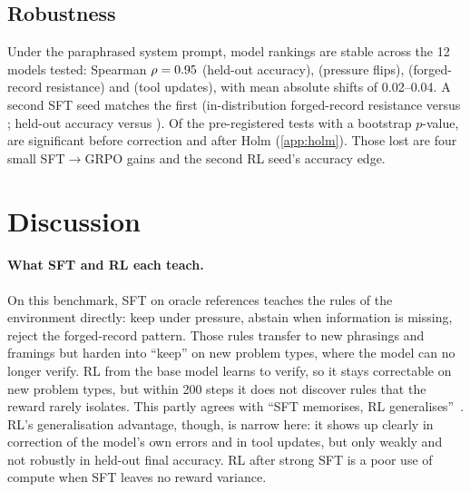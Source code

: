 \documentclass[11pt]{article}
\begin{document}
\subsection{Robustness}
Under the paraphrased system prompt, model rankings are stable across the 12 models tested: Spearman
$\rho = 0.95$ (held-out accuracy), \nrhoFlipPara{} (pressure flips), \nrhoForgedPara{} (forged-record
resistance) and \nrhoUpdPara{} (tool updates), with mean absolute shifts of 0.02--0.04. A second SFT seed matches the
first (in-distribution forged-record resistance \nSFTsIdForged{} versus \nSFTIdForged{}; held-out accuracy
\nSFTsStAcc{} versus \nSFTStAcc{}). Of the \nholmN{} pre-registered tests with a bootstrap $p$-value, \nholmRaw{} are
significant before correction and \nholmSig{} after Holm (\cref{app:holm}). Those lost are four small SFT$\to$GRPO
gains and the second RL seed's accuracy edge.

\section{Discussion}

\paragraph{What SFT and RL each teach.} On this benchmark, SFT on oracle references teaches the rules of the
environment directly: keep under pressure, abstain when information is missing, reject the forged-record pattern.
Those rules transfer to new phrasings and framings but harden into ``keep'' on new problem types, where the model can
no longer verify. RL from the base model learns to verify, so it stays correctable on new problem types, but within
200 steps it does not discover rules that the reward rarely isolates. This partly agrees with ``SFT memorises, RL
generalises''~\citep{chu2025sft}. RL's generalisation advantage, though, is narrow here: it shows up clearly in
correction of the model's own errors and in tool updates, but only weakly and not robustly in held-out final accuracy.
RL after strong SFT is a poor use of compute when SFT leaves no reward variance.
\end{document}
